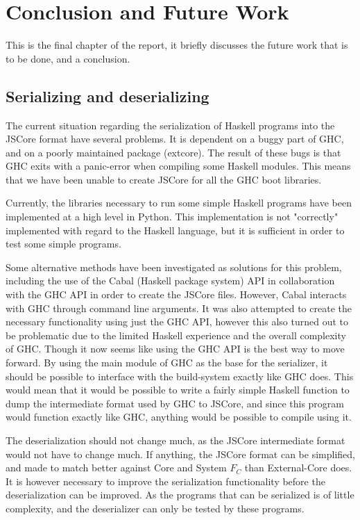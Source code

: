 
\chapter{Conclusion and Future Work}
\label{chap:conc}

This is the final chapter of the report, it briefly discusses the future work that 
is to be done, and a conclusion.

\section{Serializing and deserializing}
\label{serdes}

The current situation regarding the serialization of Haskell programs into 
the JSCore format have several problems. It is dependent on a buggy part of GHC, 
and on a poorly maintained package (extcore). The result of these bugs is that
GHC exits with a panic-error when compiling some Haskell modules. This
means that we have been unable to create JSCore for all the GHC boot libraries.

Currently, the libraries necessary to run some simple Haskell programs have been
implemented at a high level in Python. This implementation is not "correctly"
implemented with regard to the Haskell language, but it is sufficient in order
to test some simple programs.

Some alternative methods have been investigated as solutions for this problem,
including the use of the Cabal (Haskell package system) API in collaboration
with the GHC API in order to create the JSCore files. However, Cabal interacts
with GHC through command line arguments. 
It was also attempted to create the necessary functionality using just the GHC
API, however this also turned out to be problematic due to the limited Haskell 
experience and the overall complexity of GHC. Though it now seems like
using the GHC API is the best way to move forward. By using the main module of GHC
as the base for
the serializer, it should be possible to interface with the build-system
exactly like GHC does. This would mean that it would be possible to write a
fairly simple Haskell function to dump the intermediate format used by GHC
to JSCore, and since this program would function exactly like GHC, anything 
would be possible to compile using it.

The deserialization should not change much, as the JSCore intermediate format
would not have to change much. If anything, the JSCore format can be
simplified, and made to match better against Core and System $F_C$ than
External-Core does. It is however necessary to improve the serialization
functionality before the deserialization can be improved. As the programs
that can be serialized is of little complexity, and the deserializer can only be
tested by these programs.


